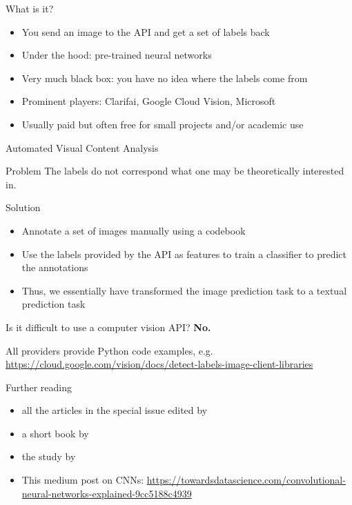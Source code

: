 \begin{frame}{What is it?}
  \begin{itemize}
  \item You send an image to the API and get a set of labels back
  \item Under the hood: pre-trained neural networks
  \item Very much black box: you have no idea where the labels come from
  \item Prominent players: Clarifai, Google Cloud Vision, Microsoft
  \item Usually paid but often free for small projects and/or academic use
  \end{itemize}

\end{frame}


\begin{frame}{Automated Visual Content Analysis  \parencite{Araujo2020b}}
  \begin{alertblock}{Problem}
The labels do not correspond what one may be theoretically interested in.
  \end{alertblock}

  \pause
  
\begin{block}{Solution}
  \begin{itemize}
  \item Annotate a set of images manually using a codebook
  \item Use the labels provided by the API as features to train a classifier to predict the annotations
  \item Thus, we essentially have transformed the image prediction task to a textual prediction task
  \end{itemize}
\end{block}
\end{frame}



\begin{frame}{Is it difficult to use a computer vision API?}
  \textbf{No.}

All providers provide Python code examples, e.g. \url{https://cloud.google.com/vision/docs/detect-labels-image-client-libraries}
  
\end{frame}



\begin{frame}{Further reading}
  \begin{itemize}
  \item all the articles in the special issue edited by \cite{Casas2022}
  \item a short book by \cite{Webbwilliams2020}
  \item the study by \cite{Araujo2020b}
  \item This medium post on CNNs:  \url{https://towardsdatascience.com/convolutional-neural-networks-explained-9cc5188c4939}
    \end{itemize}
\end{frame}




